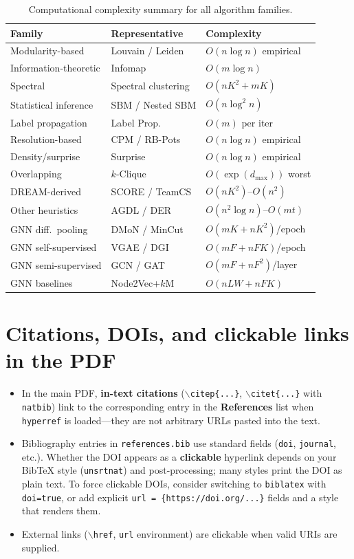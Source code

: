\documentclass[11pt]{article}
\begin{document}
\begin{table}[h]
\centering
\caption{Computational complexity summary for all algorithm families.}
\label{tab:complexity_summary}
\small
\begin{tabular}{lll}
\toprule
\textbf{Family} & \textbf{Representative} & \textbf{Complexity} \\
\midrule
Modularity-based & Louvain / Leiden & $O(n\log n)$ empirical \\
Information-theoretic & Infomap & $O(m\log n)$ \\
Spectral & Spectral clustering & $O(nK^2 + mK)$ \\
Statistical inference & SBM / Nested SBM & $O(n\log^2 n)$ \\
Label propagation & Label Prop. & $O(m)$ per iter \\
Resolution-based & CPM / RB-Pots & $O(n\log n)$ empirical \\
Density/surprise & Surprise & $O(n\log n)$ empirical \\
Overlapping & $k$-Clique & $O(\exp(d_{\max}))$ worst \\
DREAM-derived & SCORE / TeamCS & $O(nK^2)$--$O(n^2)$ \\
Other heuristics & AGDL / DER & $O(n^2\log n)$--$O(mt)$ \\
GNN diff.\ pooling & DMoN / MinCut & $O(mK + nK^2)$/epoch \\
GNN self-supervised & VGAE / DGI & $O(mF + nFK)$/epoch \\
GNN semi-supervised & GCN / GAT & $O(mF + nF^2)$/layer \\
GNN baselines & Node2Vec+$k$M & $O(nLW + nFK)$ \\
\bottomrule
\end{tabular}
\end{table}

\section{Citations, DOIs, and clickable links in the PDF}
\begin{itemize}
  \item In the main PDF, \textbf{in-text citations} (\texttt{$\backslash$citep\{...\}}, \texttt{$\backslash$citet\{...\}} with \texttt{natbib}) link to the corresponding entry in the \textbf{References} list when \texttt{hyperref} is loaded---they are not arbitrary URLs pasted into the text.
  \item Bibliography entries in \texttt{references.bib} use standard fields (\texttt{doi}, \texttt{journal}, etc.). Whether the DOI appears as a \textbf{clickable} hyperlink depends on your BibTeX style (\texttt{unsrtnat}) and post-processing; many styles print the DOI as plain text. To force clickable DOIs, consider switching to \texttt{biblatex} with \texttt{doi=true}, or add explicit \texttt{url = \{https://doi.org/...\}} fields and a style that renders them.
  \item External links (\texttt{$\backslash$href}, \texttt{url} environment) are clickable when valid URIs are supplied.
\end{itemize}
\end{document}
